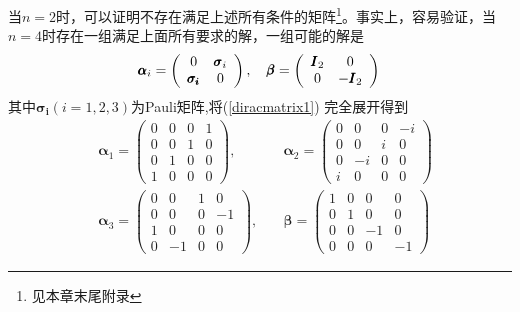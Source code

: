当$n=2$时，可以证明不存在满足上述所有条件的矩阵\footnote{见本章末尾附录}。事实上，容易验证，当$n=4$时存在一组满足上面所有要求的解，一组可能的解是
\begin{equation}
\label{diracmatrix1}
    \pmb{\alpha}_{i}=\left(                 
  \begin{array}{cc}   
    0 & \pmb{\sigma}_{i}  \\  
    \pmb{\sigma_{i}} & 0 \\  
  \end{array}
\right),\quad
\pmb{\beta}=\left(                 
  \begin{array}{cc}   
    \pmb{I}_{2} & 0  \\  
    0 & -\pmb{I}_{2} \\  
  \end{array}
\right)\\
\end{equation}
其中$\pmb{\sigma_{i}}(i=1,2,3)$为Pauli矩阵,将(\ref{diracmatrix1})
完全展开得到
\begin{equation}
\label{diracmatrix2}
\begin{aligned}
    &\pmb{\alpha}_{1}=\left(                 
  \begin{array}{cccc}   
    0 & 0 & 0 & 1 \\  
    0 & 0 & 1 & 0 \\  
    0 & 1 & 0 & 0 \\
    1 & 0 & 0 & 0
  \end{array}
\right),\quad
&\pmb{\alpha}_{2}=\left(                 
  \begin{array}{cccc}   
    0 & 0 & 0 & -i \\  
    0 & 0 & i & 0 \\  
    0 & -i & 0 & 0 \\
    i & 0 & 0 & 0
  \end{array}
\right)\\
&\pmb{\alpha}_{3}=\left(                 
  \begin{array}{cccc}   
    0 & 0 & 1 & 0 \\  
    0 & 0 & 0 & -1 \\  
    1 & 0 & 0 & 0 \\
    0 & -1 & 0 & 0
  \end{array}
\right),\quad
&\pmb{\beta}=\left(                 
  \begin{array}{cccc}   
    1 & 0 & 0 & 0 \\  
    0 & 1 & 0 & 0 \\  
    0 & 0 & -1 & 0 \\
    0 & 0 & 0 & -1
  \end{array}
\right)
\end{aligned}
\end{equation}
